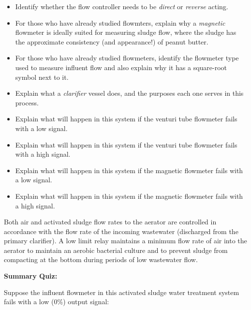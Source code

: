 \begin{itemize}
\item{} Identify whether the flow controller needs to be {\it direct} or {\it reverse} acting.
\item{} For those who have already studied flowmters, explain why a {\it magnetic} flowmeter is ideally suited for measuring sludge flow, where the sludge has the approximate consistency (and appearance!) of peanut butter.
\item{} For those who have already studied flowmeters, identify the flowmeter type used to measure influent flow and also explain why it has a square-root symbol next to it.
\item{} Explain what a {\it clarifier} vessel does, and the purposes each one serves in this process.
\item{} Explain what will happen in this system if the venturi tube flowmeter fails with a low signal.
\item{} Explain what will happen in this system if the venturi tube flowmeter fails with a high signal.
\item{} Explain what will happen in this system if the magnetic flowmeter fails with a low signal.
\item{} Explain what will happen in this system if the magnetic flowmeter fails with a high signal.
\end{itemize}







Both air and activated sludge flow rates to the aerator are controlled in accordance with the flow rate of the incoming wastewater (discharged from the primary clarifier).  A low limit relay maintains a minimum flow rate of air into the aerator to maintain an aerobic bacterial culture and to prevent sludge from compacting at the bottom during periods of low wastewater flow.







\vfil \eject

\noindent
{\bf Summary Quiz:}

Suppose the influent flowmeter in this activated sludge water treatment system fails with a low (0\%) output signal:

